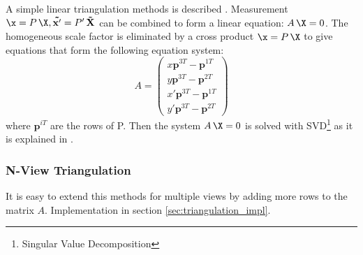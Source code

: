 A simple linear triangulation methods is described \cite{HZ2}. Measurement $\x = P \, \X , \mathbf{\tilde{x'}} = P' \, \mathbf{\tilde{X}}$ can be combined to form a linear equation: $A\, \X = 0$. The homogeneous scale factor is eliminated by a cross product $\x = P\,\X$ to give equations that form the following equation system:
\begin{equation}
A =
\begin{pmatrix}
  x \mathbf{p}^{3T} - \mathbf{p}^{1T} \\
  y \mathbf{p}^{3T} - \mathbf{p}^{2T} \\
  x' \mathbf{p}^{3T} - \mathbf{p}^{1T} \\
  y' \mathbf{p}^{3T} - \mathbf{p}^{2T}
\end{pmatrix}
\end{equation}
where $\mathbf{p}^{iT}$ are the rows of P. Then the system $A\, \X = 0$ is solved with SVD\footnote{Singular Value Decomposition} as it is explained in \cite{HZ2}.




\subsubsection{N-View Triangulation}
\label{sec:nview_triangulation}

It is easy to extend this methods for multiple views by adding more rows to the matrix $A$. Implementation in section \ref{sec:triangulation_impl}.

%
%
%
%
%
%
%
%
